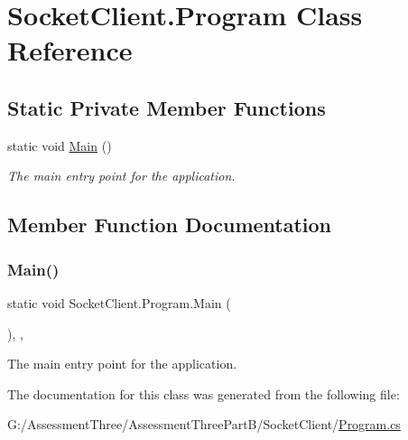 \hypertarget{class_socket_client_1_1_program}{}\section{Socket\+Client.\+Program Class Reference}
\label{class_socket_client_1_1_program}
\subsection*{Static Private Member Functions}
\begin{DoxyCompactItemize}
\item 
static void \hyperlink{class_socket_client_1_1_program_a0aaf16228df0cf3eb23965d1c8976885}{Main} ()
\begin{DoxyCompactList}\small\item\em The main entry point for the application. \end{DoxyCompactList}\end{DoxyCompactItemize}


\subsection{Member Function Documentation}
\mbox{\label{class_socket_client_1_1_program_a0aaf16228df0cf3eb23965d1c8976885}} 
\subsubsection{\texorpdfstring{Main()}{Main()}}
{\footnotesize\ttfamily static void Socket\+Client.\+Program.\+Main (\begin{DoxyParamCaption}{ }\end{DoxyParamCaption})\hspace{0.3cm}{\ttfamily [inline]}, {\ttfamily [static]}, {\ttfamily [private]}}



The main entry point for the application. 



The documentation for this class was generated from the following file\+:\begin{DoxyCompactItemize}
\item 
G\+:/\+Assessment\+Three/\+Assessment\+Three\+Part\+B/\+Socket\+Client/\hyperlink{_socket_client_2_program_8cs}{Program.\+cs}\end{DoxyCompactItemize}
